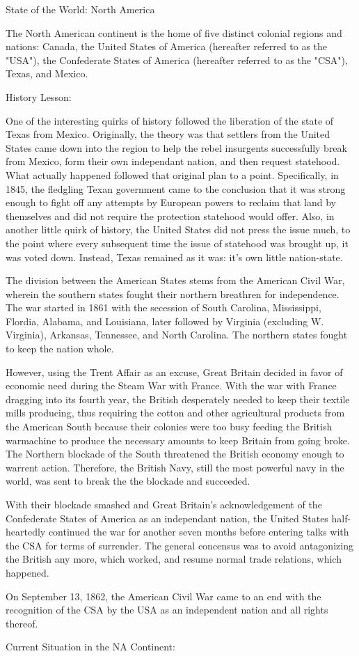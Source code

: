 \documentclass[white]{airship}
\begin{document}
\name{\wNAPolitics{}} %
State of the World: North America

The North American continent is the home of five distinct colonial
regions and nations: Canada, the United States of America (hereafter
referred to as the "USA"), the Confederate States of America
(hereafter referred to as the "CSA"), Texas, and Mexico.

History Lesson:

One of the interesting quirks of history followed the liberation of
the state of Texas from Mexico.  Originally, the theory was that
settlers from the United States came down into the region to help the
rebel insurgents successfully break from Mexico, form their own
independant nation, and then request statehood.  What actually
happened followed that original plan to a point.  Specifically, in
1845, the fledgling Texan government came to the conclusion that it
was strong enough to fight off any attempts by European powers to
reclaim that land by themselves and did not require the protection
statehood would offer.  Also, in another little quirk of history, the
United States did not press the issue much, to the point where every
subsequent time the issue of statehood was brought up, it was voted
down.  Instead, Texas remained as it was: it's own little
nation-state.

The division between the American States stems from the American Civil
War, wherein the southern states fought their northern breathren for
independence.  The war started in 1861 with the secession of South
Carolina, Mississippi, Flordia, Alabama, and Louisiana, later followed
by Virginia (excluding W. Virginia), Arkansas, Tennessee, and North
Carolina.  The northern states fought to keep the nation whole.


However, using the Trent Affair as an excuse, Great Britain decided in
favor of economic need during the Steam War with France.  With the war
with France dragging into its fourth year, the British desperately
needed to keep their textile mills producing, thus requiring the
cotton and other agricultural products from the American South because
their colonies were too busy feeding the British warmachine to produce
the necessary amounts to keep Britain from going broke.  The Northern
blockade of the South threatened the British economy enough to warrent
action.  Therefore, the British Navy, still the most powerful navy in
the world, was sent to break the the blockade and succeeded.

With their blockade smashed and Great Britain's acknowledgement of the
Confederate States of America as an independant nation, the United
States half-heartedly continued the war for another seven months
before entering talks with the CSA for terms of surrender.  The
general concensus was to avoid antagonizing the British any more,
which worked, and resume normal trade relations, which happened.

On September 13, 1862, the American Civil War came to an end with the
recognition of the CSA by the USA as an independent nation and all
rights thereof.

Current Situation in the NA Continent:
\end{document}
